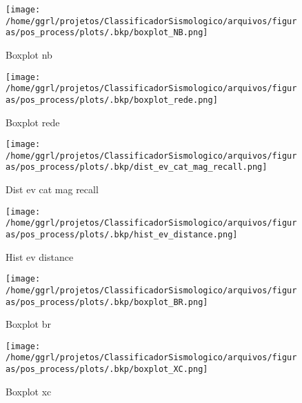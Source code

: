                     \begin{figure}[H]
                        \centering
                        \texttt{[image: /home/ggrl/projetos/ClassificadorSismologico/arquivos/figuras/pos\_process/plots/.bkp/boxplot\_NB.png]}
                        \caption{Boxplot nb}
                        \label{fig:boxplot_NB}
                    \end{figure}
                

                    \begin{figure}[H]
                        \centering
                        \texttt{[image: /home/ggrl/projetos/ClassificadorSismologico/arquivos/figuras/pos\_process/plots/.bkp/boxplot\_rede.png]}
                        \caption{Boxplot rede}
                        \label{fig:boxplot_rede}
                    \end{figure}
                

                    \begin{figure}[H]
                        \centering
                        \texttt{[image: /home/ggrl/projetos/ClassificadorSismologico/arquivos/figuras/pos\_process/plots/.bkp/dist\_ev\_cat\_mag\_recall.png]}
                        \caption{Dist ev cat mag recall}
                        \label{fig:dist_ev_cat_mag_recall}
                    \end{figure}
                

                    \begin{figure}[H]
                        \centering
                        \texttt{[image: /home/ggrl/projetos/ClassificadorSismologico/arquivos/figuras/pos\_process/plots/.bkp/hist\_ev\_distance.png]}
                        \caption{Hist ev distance}
                        \label{fig:hist_ev_distance}
                    \end{figure}
                

                    \begin{figure}[H]
                        \centering
                        \texttt{[image: /home/ggrl/projetos/ClassificadorSismologico/arquivos/figuras/pos\_process/plots/.bkp/boxplot\_BR.png]}
                        \caption{Boxplot br}
                        \label{fig:boxplot_BR}
                    \end{figure}
                

                    \begin{figure}[H]
                        \centering
                        \texttt{[image: /home/ggrl/projetos/ClassificadorSismologico/arquivos/figuras/pos\_process/plots/.bkp/boxplot\_XC.png]}
                        \caption{Boxplot xc}
                        \label{fig:boxplot_XC}
                    \end{figure}
                

